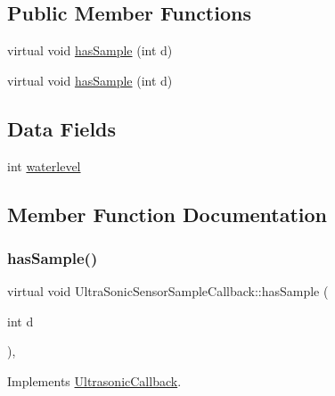\subsection*{Public Member Functions}
\begin{DoxyCompactItemize}
\item 
virtual void \hyperlink{classUltraSonicSensorSampleCallback_abe420043f2ea2123654d55d06d9315ac}{has\+Sample} (int d)
\item 
virtual void \hyperlink{classUltraSonicSensorSampleCallback_abe420043f2ea2123654d55d06d9315ac}{has\+Sample} (int d)
\end{DoxyCompactItemize}
\subsection*{Data Fields}
\begin{DoxyCompactItemize}
\item 
int \hyperlink{classUltraSonicSensorSampleCallback_ad5fd882233b06c49bcf04f97ae8b7ccb}{waterlevel}
\end{DoxyCompactItemize}


\subsection{Member Function Documentation}
\mbox{\label{classUltraSonicSensorSampleCallback_abe420043f2ea2123654d55d06d9315ac}} 
\subsubsection{\texorpdfstring{has\+Sample()}{hasSample()}\hspace{0.1cm}{\footnotesize\ttfamily [1/2]}}
{\footnotesize\ttfamily virtual void Ultra\+Sonic\+Sensor\+Sample\+Callback\+::has\+Sample (\begin{DoxyParamCaption}\item[{int}]{d }\end{DoxyParamCaption})\hspace{0.3cm}{\ttfamily [inline]}, {\ttfamily [virtual]}}



Implements \hyperlink{classUltrasonicCallback_aded93e2bea7669f1f225f8b35a085052}{Ultrasonic\+Callback}.

